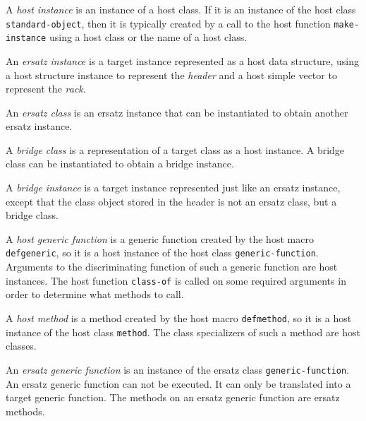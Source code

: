 \begin{definition}
A \emph{host instance} is an instance of a host class.  If it is an
instance of the host class \texttt{standard-object}, then it is
typically created by a call to the host function
\texttt{make-instance} using a host class or the name of a host class.
\end{definition}

\begin{definition}
An \emph{ersatz instance} is a target instance represented as a host
data structure, using a host structure instance to represent the
\emph{header} and a host simple vector to represent the \emph{rack}.
\end{definition}

\begin{definition}
An \emph{ersatz class} is an ersatz instance that can be instantiated
to obtain another ersatz instance.
\end{definition}

\begin{definition}
A \emph{bridge class} is a representation of a target class as a host
instance.  A bridge class can be instantiated to obtain a bridge
instance. 
\end{definition}

\begin{definition}
A \emph{bridge instance} is a target instance represented just like an
ersatz instance, except that the class object stored in the header is
not an ersatz class, but a bridge class. 
\end{definition}

\begin{definition}
A \emph{host generic function} is a generic function created by the
host macro \texttt{defgeneric}, so it is a host instance of the host
class \texttt{generic-function}.  Arguments to the discriminating
function of such a generic function are host instances.  The host
function \texttt{class-of} is called on some required arguments in
order to determine what methods to call.
\end{definition}

\begin{definition}
A \emph{host method} is a method created by the host macro
\texttt{defmethod}, so it is a host instance of the host class
\texttt{method}.  The class specializers of such a method are host
classes.
\end{definition}

\begin{definition}
An \emph{ersatz generic function} is an instance of the ersatz class
\texttt{generic-function}.  An ersatz generic function can not be
executed.  It can only be translated into a target generic function.
The methods on an ersatz generic function are ersatz methods.
\end{definition}

